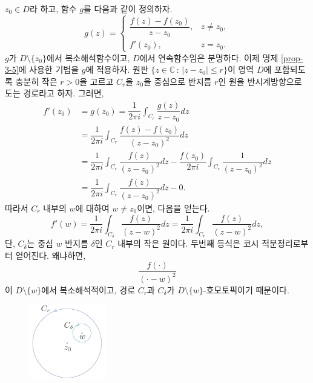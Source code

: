 $z_0\in D$라 하고,
함수 $g$를 다음과 같이 정의하자.
\[
g(z) = \begin{cases}
\dfrac{f(z)-f(z_0)}{z-z_0}, & z\ne z_0, \\
f'(z_0), & z=z_0.
\end{cases}
\]
$g$가 $D\setminus \{z_0\}$에서 복소해석함수이고, 
$D$에서 연속함수임은 분명하다.
이제 명제 \ref{prop-3-5}에 사용한 기법을 $g$에 적용하자.
원판 $\{z\in\mathbb C\,:\, |z-z_0| \le r\}$이
영역 $D$에 포함되도록 충분히 작은 $r>0$을 고르고
$C_r$을 $z_0$을 중심으로 반지름 $r$인 원을 반시계방향으로 도는 경로라고 하자.
그러면,
\begin{align}
f'(z_0) &= g(z_0)
= \dfrac1{2\pi i} \int_{C_r} \dfrac{g(z)}{z - z_0} dz \nonumber \\
&= \dfrac1{2\pi i} \int_{C_r} \dfrac{f(z)-f(z_0)}{(z-z_0)^2} dz \\
&= \dfrac1{2\pi i} \int_{C_r} \dfrac{f(z)}{(z-z_0)^2} dz
- \dfrac{f(z_0)}{2\pi i} \int_{C_r} \dfrac{1}{(z-z_0)^2} dz \nonumber \\
&= \dfrac1{2\pi i} \int_{C_r} \dfrac{f(z)}{(z-z_0)^2} dz - 0. \label{eq-3-5}
\end{align}
따라서 $C_r$ 내부의 $w$에 대하여 $w\ne z_0$이면, 다음을 얻는다.
\[
f'(w) = \dfrac1{2\pi i}\int_{C_\delta} \dfrac{f(z)}{(z-w)^2}dz
= \dfrac1{2\pi i}\int_{C_r} \dfrac{f(z)}{(z-w)^2}dz,
\]
단, $C_\delta$는  중심 $w$ 반지름 $\delta$인 $C_r$ 내부의 작은 원이다. 
두번째 등식은 코시 적분정리로부터 얻어진다. 왜냐하면,
\[
\dfrac{f(\cdot)}{(\cdot - w)^2}
\]
이 $D\setminus \{w\}$에서 복소해석적이고, 경로 $C_r$과 $C_\delta$가
$D\setminus \{w\}$-호모토픽이기 때문이다.

\begin{figure}[h!]
\begin{center}
\includegraphics[width=0.3\textwidth]{./SaltChapter/fig-3-0-11}
\end{center}
\end{figure}

